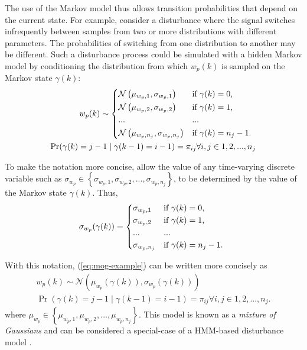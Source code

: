 The use of the Markov model thus allows transition probabilities that depend on the current state. For example, consider a disturbance where the signal switches infrequently between samples from two or more distributions with different parameters. The probabilities of switching from one distribution to another may be different. Such a disturbance process could be simulated with a hidden Markov model by conditioning the distribution from which $w_p(k)$ is sampled on the Markov state $\gamma(k)$:
\begin{equation} \label{eq:mog-example}
	\begin{split}
		w_p(k) \sim 
		\begin{cases*}
			\mathcal{N}\left(\mu_{w_p,1}, \sigma_{w_p,1}\right) & if $\gamma(k)=0$, \\
			\mathcal{N}\left(\mu_{w_p,2}, \sigma_{w_p,2}\right) & if $\gamma(k)=1$, \\
			... & ...\\
			\mathcal{N}\left(\mu_{w_p,n_j}, \sigma_{w_p,n_j}\right) & if $\gamma(k)=n_j-1$.
		\end{cases*} \\
	\Pr(\gamma(k)=j-1 \mid \gamma(k-1)=i-1)=\pi_{ij} \forall i,j \in {1,2,...,n_j}
	\end{split}
\end{equation}

To make the notation more concise, allow the value of any time-varying discrete variable such as $\sigma_{w_p} \in \left\{\sigma_{w_p,1}, \sigma_{w_p,2},..., \sigma_{w_p,n_j}\right\}$, to be determined by the value of the Markov state $\gamma(k)$. Thus,
\begin{equation} \label{eq:A-selection}
	\sigma_{w_p}(\gamma(k)) = 
	\begin{cases*}
		\sigma_{w_p,1} & if $\gamma(k)=0$, \\
		\sigma_{w_p,2} & if $\gamma(k)=1$, \\
		... & ...\\
		\sigma_{w_p,n_j} & if $\gamma(k)=n_j-1$.
	\end{cases*}
\end{equation}


With this notation, (\ref{eq:mog-example}) can be written more concisely as
\begin{equation} \label{eq:mog-example2}
	\begin{split}
		w_p(k) \sim \mathcal{N}\left(\mu_{w_p}(\gamma(k)), \sigma_{w_p}(\gamma(k))\right) \\
		\Pr(\gamma(k)=j-1 \mid \gamma(k-1)=i-1)=\pi_{ij} \forall i,j \in {1,2,...,n_j}.
	\end{split}
\end{equation}
where $\mu_{w_p}\in\left\{\mu_{w_p,1},\mu_{w_p,2},...,\mu_{w_p,n_j}\right\}$. This model is known as a \textit{mixture of Gaussians} and can be considered a special-case of a HMM-based disturbance model \citep{wong_disturbance_2007}.

